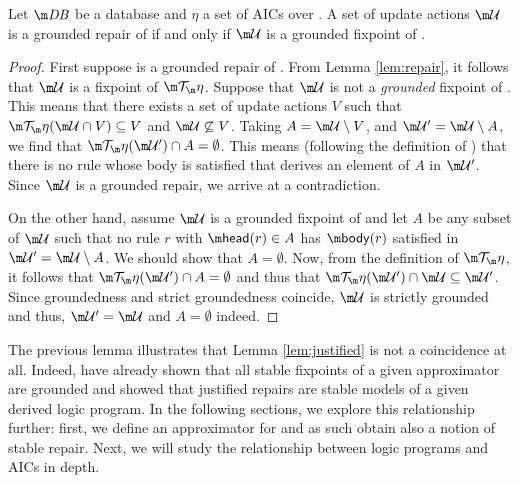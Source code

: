 \begin{lemma}
 Let $\db$ be a database and $\eta$ a set of AICs over \db. A set of update actions $\UU$ is a grounded repair of \fulldb if and only if $\UU$ is a grounded fixpoint of \Op. 
\end{lemma}
\begin{proof}
 First suppose \UU is a grounded repair of \fulldb. From Lemma \ref{lem:repair}, it follows that $\UU$ is a fixpoint of $\Op$. Suppose that $\UU$ is not a \emph{grounded} fixpoint of \Op. This means that there exists a set of update actions $V$ such that $\Op(\UU\cap V) \subseteq V$ and $\UU \not \subseteq V$. Taking $A=\UU\setminus V$, and $\UU'=\UU\setminus A$, we find that $\Op(\UU') \cap A = \emptyset$. This means (following the definition of \Op) that there is no rule whose body is satisfied  that derives an element of $A$ in $\UU'$. Since $\UU$ is a grounded repair, we arrive at a contradiction. 
 
 On the other hand, assume $\UU$ is a grounded fixpoint of \Op and let $A$ be any subset of $\UU$ such that no rule $r$ with $\head(r)\in A$ has $\body(r)$ satisfied in $\UU'=\UU\setminus A$. We should show that $A=\emptyset$. Now, from the definition of $\Op$, it follows that $\Op(\UU')\cap A=\emptyset$ and thus that $\Op(\UU') \cap \UU \subseteq \UU'$. Since groundedness and strict groundedness coincide, $\UU$ is strictly grounded and thus, $\UU'=\UU$ and $A=\emptyset$ indeed. 
\end{proof}

The previous lemma illustrates that Lemma \ref{lem:justified} is not a coincidence at all. 
Indeed,  have already shown that all stable fixpoints of a given approximator are grounded and 
\citet[Theorem~6]{tplp/CaropreseT11} showed that justified repairs are stable models of a given derived logic program. 
In the following sections, we explore this relationship further: first, we define an approximator for \Op and as such obtain also a notion of stable repair. 
Next, we will study the relationship between logic programs and AICs in depth. 


